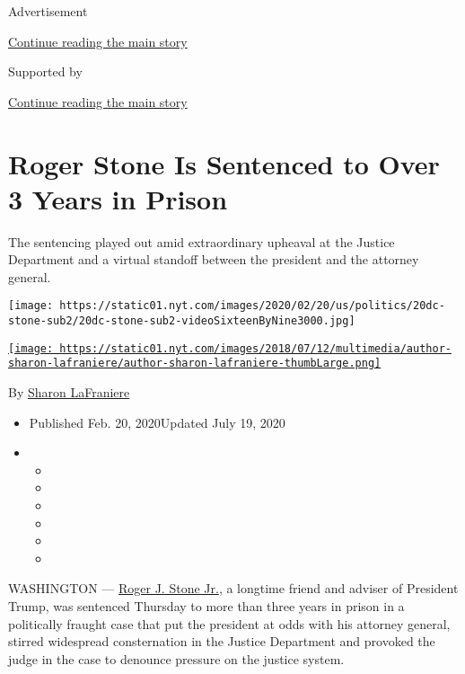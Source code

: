 Advertisement

\protect\hyperlink{after-top}{Continue reading the main story}

Supported by

\protect\hyperlink{after-sponsor}{Continue reading the main story}

\hypertarget{roger-stone-is-sentenced-to-over-3-years-in-prison}{%
\section{Roger Stone Is Sentenced to Over 3 Years in
Prison}\label{roger-stone-is-sentenced-to-over-3-years-in-prison}}

The sentencing played out amid extraordinary upheaval at the Justice
Department and a virtual standoff between the president and the attorney
general.

\texttt{[image: https://static01.nyt.com/images/2020/02/20/us/politics/20dc-stone-sub2/20dc-stone-sub2-videoSixteenByNine3000.jpg]}

\href{https://www.nytimes.com/by/sharon-lafraniere}{\texttt{[image: https://static01.nyt.com/images/2018/07/12/multimedia/author-sharon-lafraniere/author-sharon-lafraniere-thumbLarge.png]}}

By \href{https://www.nytimes.com/by/sharon-lafraniere}{Sharon
LaFraniere}

\begin{itemize}
\item
  Published Feb. 20, 2020Updated July 19, 2020
\item
  \begin{itemize}
  \item
  \item
  \item
  \item
  \item
  \item
  \end{itemize}
\end{itemize}

WASHINGTON ---
\href{https://www.nytimes.com/2020/07/19/us/politics/roger-stone-mo-kelly-slur.html}{Roger
J. Stone Jr.}, a longtime friend and adviser of President Trump, was
sentenced Thursday to more than three years in prison in a politically
fraught case that put the president at odds with his attorney general,
stirred widespread consternation in the Justice Department and provoked
the judge in the case to denounce pressure on the justice system.

